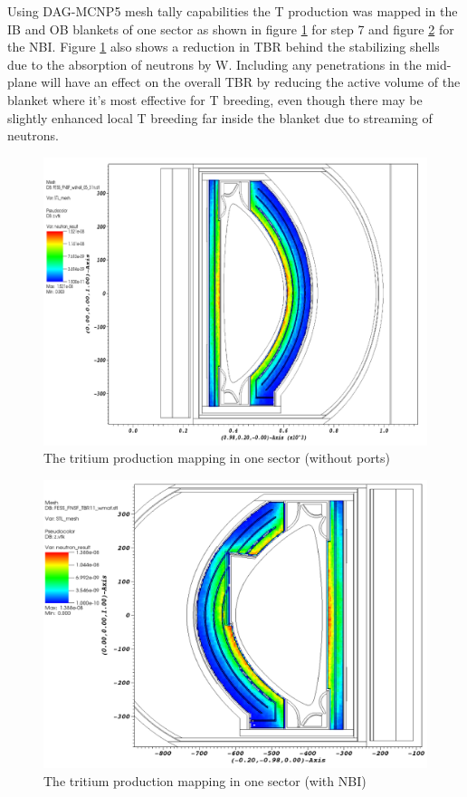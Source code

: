 \documentclass[12pt, letterpaper]{elsarticle}
\begin{document}
Using DAG-MCNP5 mesh tally capabilities the T production was mapped in the IB and OB blankets of one sector as shown in figure \ref{fig:step7} for step 7 and figure \ref{fig:NBI} for the NBI. Figure \ref{fig:step7} also shows a reduction in TBR behind the stabilizing shells due to the absorption of neutrons by W. Including any penetrations in the mid-plane will have an effect on the overall TBR by reducing the active volume of the blanket where it's most effective for T breeding, even though there may be slightly enhanced local T breeding far inside the blanket due to streaming of neutrons.
\begin{figure}[h!]
  \centering
  \includegraphics[scale=0.4]{../plots/step7.png}
  \caption{The tritium production mapping in one sector (without ports)}
  \label{fig:step7}
\end{figure}
\begin{figure}[h!]
  \centering
  \includegraphics[scale=0.4]{../plots/NBI.png}
  \caption{The tritium production mapping in one sector (with NBI)}
  \label{fig:NBI}
\end{figure}
\end{document}
